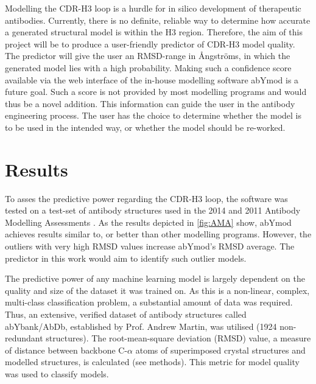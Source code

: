 \documentclass[12pt]{article}
\begin{document}
Modelling the CDR-H3 loop is a hurdle for in silico development of
therapeutic antibodies. Currently, there is no definite, reliable way
to determine how accurate a generated structural model is within the
H3 region. Therefore, the aim of this project will be to produce a
user-friendly predictor of CDR-H3 model quality. The predictor will give
the user an RMSD-range in {\AA}ngstr\"{o}ms, in which the generated model lies
with a high probability. Making such a confidence score available via
the web interface of the in-house modelling software abYmod is a
future goal. Such a score is not provided by most modelling programs
and would thus be a novel addition.  This information can guide the
user in the antibody engineering process. The user has the choice to
determine whether the model is to be used in the intended way, or
whether the model should be re-worked.

\section{Results}
To asses the predictive power regarding the CDR-H3 loop, the software
was tested on a test-set of antibody structures used in the 2014 and
2011 Antibody Modelling Assessments
\cite{Almagro2011,Almagro2014}. As the results depicted in
\ref{fig:AMA} show, abYmod achieves results similar to, or better than
other modelling programs. However, the outliers with very high RMSD
values increase abYmod's RMSD average. The predictor in this work
would aim to identify such outlier models.

The predictive power of any machine learning model is largely
dependent on the quality and size of the dataset it was trained on. As
this is a non-linear, complex, multi-class classification problem, a
substantial amount of data was required. Thus, an extensive, verified
dataset of antibody structures called abYbank/AbDb\cite{XXXX},
established by Prof. Andrew Martin, was utilised (1924 non-redundant
structures). The root-mean-square deviation (RMSD) value, a measure of
distance between backbone C-$\alpha$ atoms of superimposed crystal structures
and modelled structures, is calculated (see methods). This metric for
model quality was used to classify models.
\end{document}
